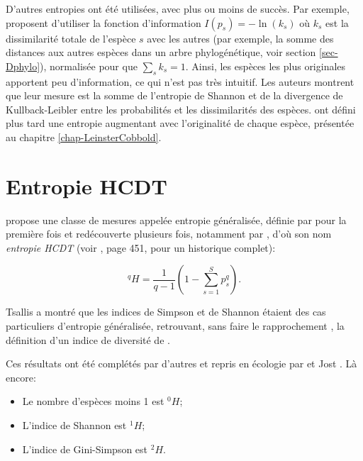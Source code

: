 \documentclass[
  11pt,
  american,
  a4paper,
  extrafontsizes,onecolumn,openright
  ]{memoir}
\providecommand{\tightlist}{%
  \setlength{\itemsep}{0pt}\setlength{\parskip}{0pt}}
\begin{document}
D'autres entropies ont été utilisées, avec plus ou moins de succès.
Par exemple, \textcite{Ricotta2003c} proposent d'utiliser la fonction d'information \(I(p_s) = -\ln(k_s)\) où \(k_s\) est la dissimilarité totale de l'espèce \(s\) avec les autres (par exemple, la somme des distances aux autres espèces dans un arbre phylogénétique, voir section \ref{sec-Dphylo}), normalisée pour que \(\sum_s{k_s} = 1\).
Ainsi, les espèces les plus originales apportent peu d'information, ce qui n'est pas très intuitif.
Les auteurs montrent que leur mesure est la somme de l'entropie de Shannon et de la divergence de Kullback-Leibler entre les probabilités et les dissimilarités des espèces.
\textcite{Ricotta2006b} ont défini plus tard une entropie augmentant avec l'originalité de chaque espèce, présentée au chapitre \ref{chap-LeinsterCobbold}.

\hypertarget{entropie-hcdt}{%
\section{Entropie HCDT}\label{entropie-hcdt}}

\textcite{Tsallis1988} propose une classe de mesures appelée entropie généralisée, définie par \textcite{Havrda1967} pour la première fois et redécouverte plusieurs fois, notamment par \textcite{Daroczy1970}, d'où son nom \emph{entropie HCDT} (voir \textcite{Mendes2008}, page 451, pour un historique complet):

\begin{equation}
  \label{eq:HCDT}
  ^{q}\!H = \frac{1}{q-1} \left( 1 - \sum^S_{s=1}{p^q_s} \right).
\end{equation}

Tsallis a montré que les indices de Simpson et de Shannon étaient des cas particuliers d'entropie généralisée, retrouvant, sans faire le rapprochement \autocite{Ricotta2005}, la définition d'un indice de diversité de \textcite{Patil1982}.

Ces résultats ont été complétés par d'autres et repris en écologie par \textcite{Keylock2005} et Jost \autocite*{Jost2006,Jost2007}.
Là encore:

\begin{itemize}
\tightlist
\item
  Le nombre d'espèces moins 1 est \(^{0}\!H\);
\item
  L'indice de Shannon est \(^{1}\!H\);
\item
  L'indice de Gini-Simpson est \(^{2}\!H\).
\end{itemize}
\end{document}
